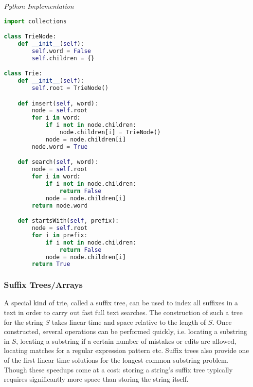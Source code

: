 \documentclass{article}
\begin{document}
\vspace{8pt} \emph{Python Implementation}
\begin{lstlisting}[language=Python]
import collections

class TrieNode:
    def __init__(self):
        self.word = False
        self.children = {}

class Trie:
    def __init__(self):
        self.root = TrieNode()

    def insert(self, word):
        node = self.root
        for i in word:
            if i not in node.children:
                node.children[i] = TrieNode()
            node = node.children[i]
        node.word = True

    def search(self, word):
        node = self.root
        for i in word:
            if i not in node.children:
                return False
            node = node.children[i]
        return node.word

    def startsWith(self, prefix):
        node = self.root
        for i in prefix:
            if i not in node.children:
                return False
            node = node.children[i]
        return True
\end{lstlisting}

    \subsubsection{Suffix Trees/Arrays}
    A special kind of trie, called a suffix tree, can be used to index all suffixes in a text in order to carry out fast full text searches. The construction of such a tree for the string $S$ takes linear time and space relative to the length of $S$. Once constructed, several operations can be performed quickly, i.e. locating a substring in $S$, locating a substring if a certain number of mistakes or edits are allowed, locating matches for a regular expression pattern etc. Suffix trees also provide one of the first linear-time solutions for the longest common substring problem. Though these speedups come at a cost: storing a string's suffix tree typically requires significantly more space than storing the string itself.
    
\end{document}
